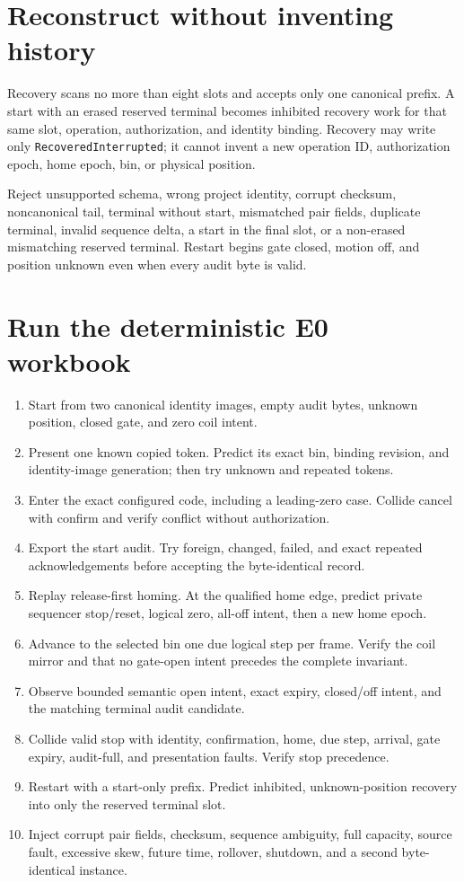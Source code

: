 \documentclass[10pt]{article}
\begin{document}
\section{Reconstruct without inventing history}
Recovery scans no more than eight slots and accepts only one canonical prefix.
A start with an erased reserved terminal becomes inhibited recovery work for
that same slot, operation, authorization, and identity binding. Recovery may
write only \texttt{Recovered\-Interrupted}; it cannot invent a new operation ID,
authorization epoch, home epoch, bin, or physical position.

Reject unsupported schema, wrong project identity, corrupt checksum,
noncanonical tail, terminal without start, mismatched pair fields, duplicate
terminal, invalid sequence delta, a start in the final slot, or a non-erased
mismatching reserved terminal. Restart begins gate closed, motion off, and
position unknown even when every audit byte is valid.

\newpage
\section{Run the deterministic E0 workbook}
\begin{enumerate}
 \item Start from two canonical identity images, empty audit bytes, unknown
       position, closed gate, and zero coil intent.
 \item Present one known copied token. Predict its exact bin, binding revision,
       and identity-image generation; then try unknown and repeated tokens.
 \item Enter the exact configured code, including a leading-zero case. Collide
       cancel with confirm and verify conflict without authorization.
 \item Export the start audit. Try foreign, changed, failed, and exact repeated
       acknowledgements before accepting the byte-identical record.
 \item Replay release-first homing. At the qualified home edge, predict private
       sequencer stop/reset, logical zero, all-off intent, then a new home epoch.
 \item Advance to the selected bin one due logical step per frame. Verify the
       coil mirror and that no gate-open intent precedes the complete invariant.
 \item Observe bounded semantic open intent, exact expiry, closed/off intent,
       and the matching terminal audit candidate.
 \item Collide valid stop with identity, confirmation, home, due step, arrival,
       gate expiry, audit-full, and presentation faults. Verify stop precedence.
 \item Restart with a start-only prefix. Predict inhibited, unknown-position
       recovery into only the reserved terminal slot.
 \item Inject corrupt pair fields, checksum, sequence ambiguity, full capacity,
       source fault, excessive skew, future time, rollover, shutdown, and a
       second byte-identical instance.
\end{enumerate}
\end{document}

